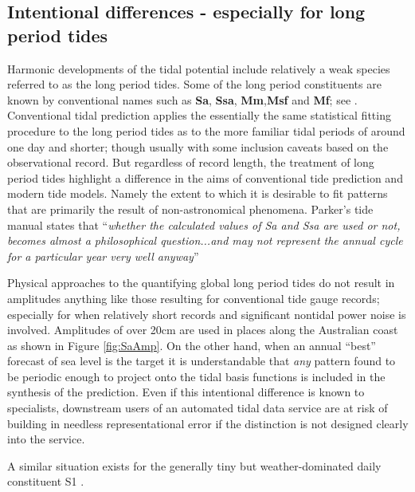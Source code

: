 \subsection{Intentional differences - especially for long period tides}
Harmonic developments of the tidal potential include relatively a weak species referred to as the long period tides.  Some of the long period constituents are known by conventional names such as \textbf{Sa}, \textbf{Ssa}, \textbf{Mm},\textbf{Msf} and \textbf{Mf}; see \cite[table 4] {10.1016/b978-0-444-53802-4.00058-0}.
Conventional tidal prediction applies the essentially the same statistical fitting procedure to the long period tides as to the more familiar tidal periods of around one day and shorter; though usually with some inclusion caveats based on the observational record. 
But regardless of record length, the treatment of long period tides highlight a difference in the aims of conventional tide prediction and modern tide models.   Namely the extent to which it is desirable to fit patterns that are primarily the result of non-astronomical phenomena.
Parker's tide manual states that ``\textit{whether the calculated values of Sa and Ssa are used or not, becomes almost a philosophical question...and may not represent the annual cycle for a particular year very well anyway}''  \citep[Section 3.7]{Parker:2007wq} 

Physical approaches to the quantifying global long period tides \citep{Egbert:1994wz} do not result in amplitudes anything like those resulting for conventional tide gauge records; especially for when relatively short records and significant nontidal power noise is involved.   Amplitudes of over 20cm are used in places along the Australian coast as shown in Figure \ref{fig:SaAmp}. On the other hand, when an annual ``best'' forecast of sea level is the target it is understandable that \textit{any} pattern found to be periodic enough to project onto the tidal basis functions is included in the synthesis of the prediction. 
Even if this intentional difference is known to specialists, downstream users of an automated tidal data service are at risk of building in needless representational error if the distinction is not designed clearly into the service.


A similar situation exists for the generally tiny but weather-dominated daily constituent S1 \cite{Ray:2004ts}.



